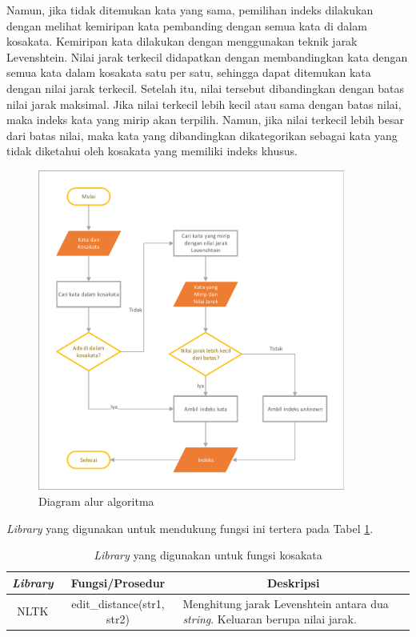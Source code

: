 Namun, jika tidak ditemukan kata yang sama, pemilihan indeks dilakukan dengan melihat kemiripan kata pembanding dengan semua kata di dalam kosakata. Kemiripan kata dilakukan dengan menggunakan teknik jarak Levenshtein. Nilai jarak terkecil didapatkan dengan membandingkan kata dengan semua kata dalam kosakata satu per satu, sehingga dapat ditemukan kata dengan nilai jarak terkecil. Setelah itu, nilai tersebut dibandingkan dengan batas nilai jarak maksimal. Jika nilai terkecil lebih kecil atau sama dengan batas nilai, maka indeks kata yang mirip akan terpilih. Namun, jika nilai terkecil lebih besar dari batas nilai, maka kata yang dibandingkan dikategorikan sebagai kata yang tidak diketahui oleh kosakata yang memiliki indeks khusus.

\begin{figure}[H]
	\centering
	\includegraphics[width=0.9\textwidth, trim=2 2 2 2, clip]{resources/3/ta_index.pdf}
	\caption{Diagram alur algoritma}
	\label{fig:ta_index}
\end{figure}

\textit{Library} yang digunakan untuk mendukung fungsi ini tertera pada Tabel \ref{tbl:vocab_library}.

\begin{table}[H]
	\caption{\textit{Library} yang digunakan untuk fungsi kosakata}
    \label{tbl:vocab_library}
    \centering
	\begin{tabularx}{\textwidth}{|c|c|X|}
		\hline
		\textit{\textbf{Library}} & \textbf{Fungsi/Prosedur}   & \multicolumn{1}{c|}{\textbf{Deskripsi}}                                              \\ \hline
		NLTK                      & edit\_distance(str1, str2) & Menghitung jarak Levenshtein antara dua \textit{string}. Keluaran berupa nilai jarak. \\ \hline
	\end{tabularx}
\end{table}

